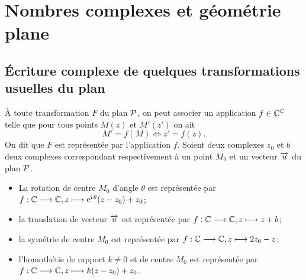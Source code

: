 \section{Nombres complexes et géométrie plane}
\label{sec:complexesetgeometrie}
\subsection{Écriture complexe de quelques transformations usuelles du plan}
\label{subsec:ecriturecomplexeettransformations}
À toute transformation \(F\) du plan \(\P\), on peut associer un application \(f 
\in \C^{\C}\) telle que pour tous points \(M(z)\) et \(M'(z')\) on ait
\begin{equation}
    M'=f(M) \iff z'=f(z).
\end{equation}
On dit que \(F\) est représentée par l'application \(f\). Soient deux complexes 
\(z_0\) et \(b\) deux complexes correspondant respectivement à un point \(M_0\) 
et un vecteur \(\vect{u}\) du plan \(\P\).
\begin{itemize}
    \item La rotation de centre \(M_0\) d'angle \(\theta\) est représentée par 
        \(\fonctionL{f}{\C}{\C}{z}{\expc{}{\theta}(z-z_0) +z_0}\);
    \item la translation de vecteur \(\vect{u}\) est représentée par 
        \(\fonctionL{f}{\C}{\C}{z}{z+b}\);
    \item la symétrie de centre \(M_0\) est représentée par 
        \(\fonctionL{f}{\C}{\C}{z}{2z_0-z}\);
    \item l'homothétie de rapport \(k\neq 0\) et de centre \(M_0\) est 
        représentée par \(\fonctionL{f}{\C}{\C}{z}{k(z-z_0)+z_0}\).
\end{itemize}
